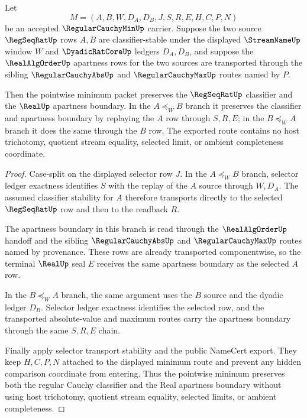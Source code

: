 \begin{theorem}
\label{thm:regular-cauchy-min-apartness-stability}
Let
$$
M=(A,B,W,D_A,D_B,J,S,R,E,H,C,P,N)
$$
be an accepted $\RegularCauchyMinUp$ carrier. Suppose the two source $\RegSeqRatUp$ rows $A,B$ are classifier-stable under the displayed $\StreamNameUp$ window $W$ and $\DyadicRatCoreUp$ ledgers $D_A,D_B$, and suppose the $\RealAlgOrderUp$ apartness rows for the two sources are transported through the sibling $\RegularCauchyAbsUp$ and $\RegularCauchyMaxUp$ routes named by $P$.

Then the pointwise minimum packet preserves the $\RegSeqRatUp$ classifier and the $\RealUp$ apartness boundary. In the $A \preceq_W B$ branch it preserves the classifier and apartness boundary by replaying the $A$ row through $S,R,E$; in the $B \preceq_W A$ branch it does the same through the $B$ row. The exported route contains no host trichotomy, quotient stream equality, selected limit, or ambient completeness coordinate.
\end{theorem}
\begin{proof}
Case-split on the displayed selector row $J$. In the $A \preceq_W B$ branch, selector ledger exactness identifies $S$ with the replay of the $A$ source through $W,D_A$. The assumed classifier stability for $A$ therefore transports directly to the selected $\RegSeqRatUp$ row and then to the readback $R$.

The apartness boundary in this branch is read through the $\RealAlgOrderUp$ handoff and the sibling $\RegularCauchyAbsUp$ and $\RegularCauchyMaxUp$ routes named by provenance. These rows are already transported componentwise, so the terminal $\RealUp$ seal $E$ receives the same apartness boundary as the selected $A$ row.

In the $B \preceq_W A$ branch, the same argument uses the $B$ source and the dyadic ledger $D_B$. Selector ledger exactness identifies the selected row, and the transported absolute-value and maximum routes carry the apartness boundary through the same $S,R,E$ chain.

Finally apply selector transport stability and the public NameCert export. They keep $H,C,P,N$ attached to the displayed minimum route and prevent any hidden comparison coordinate from entering. Thus the pointwise minimum preserves both the regular Cauchy classifier and the Real apartness boundary without using host trichotomy, quotient stream equality, selected limits, or ambient completeness.
\end{proof}

